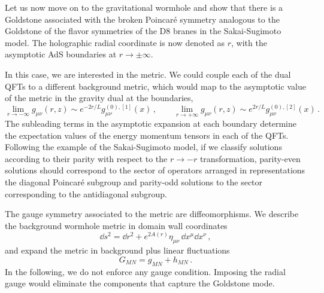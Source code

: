 Let us now move on to the gravitational wormhole and show that there is a Goldstone associated with the broken Poincar\'e symmetry analogous to the Goldstone of the flavor symmetries of the D8 branes in the Sakai-Sugimoto model.
The holographic radial coordinate is now denoted as $r$, with the asymptotic AdS boundaries at $r\to \pm\infty$.

In this case, we are interested in the metric.
We could couple each of the dual QFTs to a different background metric, which would map to the asymptotic value of the metric in the gravity dual at the boundaries,
\begin{equation}
	\lim_{r\to-\infty} g_{\mu\nu}(r,z)\sim e^{-2r/L}g^{(0),[1]}_{\mu\nu}(x)
	\,,\qquad
	\lim_{r\to+\infty} g_{\mu\nu}(r,z)\sim e^{2r/L}g^{(0),[2]}_{\mu\nu}(x)\,.
\end{equation}
The subleading terms in the asymptotic expansion at each boundary determine the expectation values of the energy momentum tensors in each of the QFTs.
Following the example of the Sakai-Sugimoto model, if we classify solutions according to their parity with respect to the $r\to -r$ transformation, parity-even solutions should correspond to the sector of operators arranged in representations the diagonal Poincar\'e subgroup and parity-odd solutions to the sector corresponding to the antidiagonal subgroup. 

The gauge symmetry associated to the metric are diffeomorphisms. 
We describe the background wormhole metric in domain wall coordinates
\begin{equation}
	\dd s^2
	=
	\dd r^2+e^{2A(r)}\eta_{\mu\nu}\,\dd x^\mu \dd x^\nu\,,
\end{equation}
and expand the metric in background plus linear fluctuations
\begin{equation}
	G_{MN}=g_{MN}+h_{MN}\,.
\end{equation}
In the following, we do not enforce any gauge condition.
Imposing the radial gauge would eliminate the components that capture the Goldstone mode.


